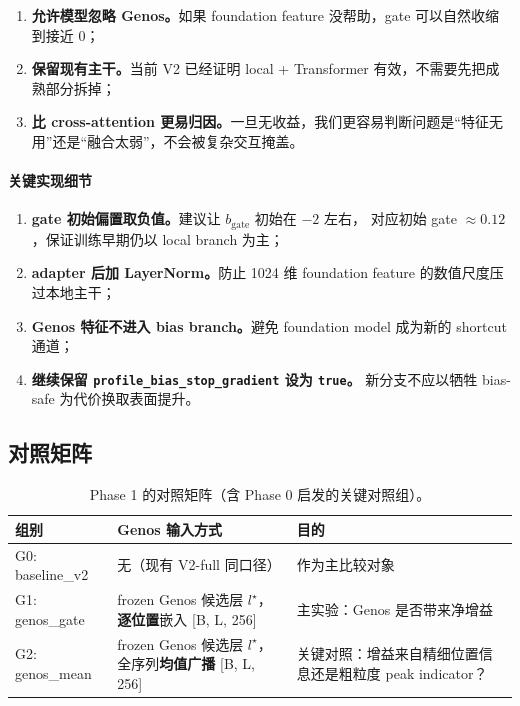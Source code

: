 \documentclass[11pt,a4paper]{ctexart}
\begin{document}
\begin{enumerate}[leftmargin=2em]
  \item \textbf{允许模型忽略 Genos。}如果 foundation feature 没帮助，gate 可以自然收缩到接近 0；
  \item \textbf{保留现有主干。}当前 V2 已经证明 local + Transformer 有效，不需要先把成熟部分拆掉；
  \item \textbf{比 cross-attention 更易归因。}一旦无收益，我们更容易判断问题是“特征无用”还是“融合太弱”，不会被复杂交互掩盖。
\end{enumerate}

\paragraph{关键实现细节}

\begin{enumerate}[leftmargin=2em]
  \item \textbf{gate 初始偏置取负值。}建议让 $b_{\mathrm{gate}}$ 初始在 $-2$ 左右，
  对应初始 gate $\approx 0.12$，保证训练早期仍以 local branch 为主；
  \item \textbf{adapter 后加 LayerNorm。}防止 1024 维 foundation feature 的数值尺度压过本地主干；
  \item \textbf{Genos 特征不进入 bias branch。}避免 foundation model 成为新的 shortcut 通道；
  \item \textbf{继续保留 \texttt{profile\_bias\_stop\_gradient} 设为 \texttt{true}。}
  新分支不应以牺牲 bias-safe 为代价换取表面提升。
\end{enumerate}

\subsection{对照矩阵}

\begin{table}[H]
\centering
\small
\caption{Phase 1 的对照矩阵（含 Phase 0 启发的关键对照组）。}
\label{tab:phase1_matrix}
\begin{tabularx}{\textwidth}{l l Y}
\toprule
组别 & Genos 输入方式 & 目的 \\
\midrule
G0: baseline\_v2 & 无（现有 V2-full 同口径） & 作为主比较对象 \\
G1: genos\_gate & frozen Genos 候选层 $l^\star$，\textbf{逐位置}嵌入 [B, L, 256] & 主实验：Genos 是否带来净增益 \\
G2: genos\_mean & frozen Genos 候选层 $l^\star$，全序列\textbf{均值广播} [B, L, 256] & 关键对照：增益来自精细位置信息还是粗粒度 peak indicator？ \\
\bottomrule
\end{tabularx}
\end{table}
\end{document}
